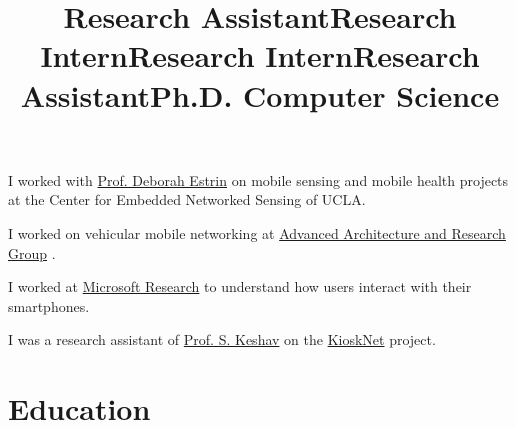 \documentclass[margin]{res}
\begin{document}
\begin{resume}
\title{\bf  Research Assistant}
\begin{position}
  I worked with {\href{https://en.wikipedia.org/wiki/Deborah_Estrin} {Prof. Deborah Estrin}} on mobile sensing and mobile health projects at the Center for Embedded Networked Sensing of UCLA.
\end{position}

\vspace{-0.15cm}

\title{\bf  Research Intern}
\begin{position}
I worked on vehicular mobile networking at {\href{http://www.cisco.com/web/about/ac50/ac207/crc_new/index.html} {Advanced Architecture and Research Group}}
.
\end{position}

\vspace{-0.15cm}

\title{\bf  Research Intern}
\begin{position}
I worked at {\href{http://research.microsoft.com/en-us/groups/nrg/} {Microsoft Research}}
to understand how users interact with their smartphones.
\end{position}

\vspace{-0.15cm}

\title{\bf  Research Assistant}
\begin{position}
I was a research assistant of {\href{https://en.wikipedia.org/wiki/Srinivasan_Keshav} {Prof. S. Keshav}} on the  {\href{https://en.wikipedia.org/wiki/KioskNet} {KioskNet}} project.
\end{position}


\title{\bf Ph.D. Computer Science}
\employer{}
\section{\sc \large Education}
\begin{position}
\end{position}


\end{resume}
\end{document}
